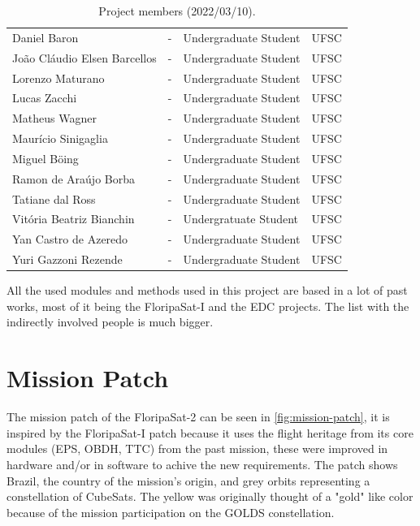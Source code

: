 \begin{table}[ht]
\begin{tabular}{lllc}
        Daniel Baron                        & -         & Undergraduate Student & UFSC \\
        João Cláudio Elsen Barcellos        & -         & Undergraduate Student & UFSC \\
        Lorenzo Maturano                    & -         & Undergraduate Student & UFSC \\
        Lucas Zacchi                        & -         & Undergraduate Student & UFSC \\
        Matheus Wagner                      & -         & Undergraduate Student & UFSC \\
        Maurício Sinigaglia                 & -         & Undergraduate Student & UFSC \\
        Miguel Böing                        & -         & Undergraduate Student & UFSC \\
        Ramon de Araújo Borba               & -         & Undergraduate Student & UFSC \\
        Tatiane dal Ross                    & -         & Undergraduate Student & UFSC \\
        Vitória Beatriz Bianchin            & -         & Undergratuate Student & UFSC \\
        Yan Castro de Azeredo               & -         & Undergraduate Student & UFSC \\
        Yuri Gazzoni Rezende                & -         & Undergraduate Student & UFSC \\
        \bottomrule[1.5pt]
    \end{tabular}
    \caption{Project members (2022/03/10).}
    \label{tab:team-members}
\end{table}

All the used modules and methods used in this project are based in a lot of past works, most of it being the FloripaSat-I and the EDC projects. The list with the indirectly involved people is much bigger.

\section{Mission Patch}

The mission patch of the FloripaSat-2 can be seen in \autoref{fig:mission-patch}, it is inspired by the FloripaSat-I patch \cite{floripasat} because it uses the flight heritage from its core modules (EPS, OBDH, TTC) from the past mission, these were improved in hardware and/or in software to achive the new requirements. The patch shows Brazil, the country of the mission's origin, and grey orbits representing a constellation of CubeSats. The yellow was originally thought of a "gold" like color because of the mission participation on the GOLDS constellation.

